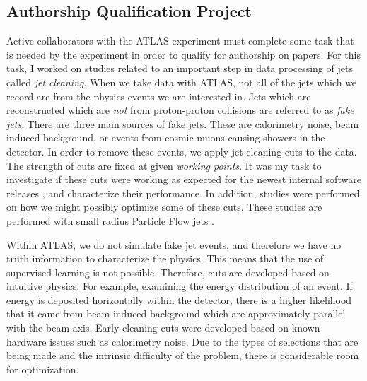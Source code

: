 \documentclass[12pt]{article}
\begin{document}
\subsection{Authorship Qualification Project}
Active collaborators with the ATLAS experiment must complete some task that is
needed by the experiment in order to qualify for authorship on papers. For this
task, I worked on studies related to an important step in data processing of
jets called
\textit{jet cleaning}. When we take data with ATLAS, not all of the jets which
we record are from the physics events we are interested in. Jets which are
reconstructed which are \textit{not} from proton-proton collisions are referred
to as \textit{fake jets}. There are three main sources of fake jets. These are
calorimetry noise, beam induced background, or events from cosmic muons causing
showers in the detector. In order to remove these events, we apply jet cleaning
cuts to the data. The strength of cuts are fixed at given \textit{working
points}. It was my task to investigate if these cuts were working as expected
for the newest internal software releases \cite{atlas_simulation}, and
characterize their performance. In addition, studies were performed on how we
might possibly optimize some of these cuts. These studies are performed with
small radius Particle Flow jets \cite{pflow_jets}.

Within ATLAS, we do not simulate fake jet events, and therefore we have no truth
information to characterize the physics. This means that the use of supervised
learning is not possible. Therefore, cuts are developed based on intuitive
physics. For example, examining the energy distribution of an event. If energy
is deposited horizontally within the detector, there is a higher likelihood that
it came from beam induced background which are approximately parallel with the
beam axis. Early cleaning cuts were developed based on known hardware issues
such as calorimetry noise. Due to the types of selections that are being made
and the intrinsic difficulty of the problem, there is considerable room for
optimization. 
\end{document}
